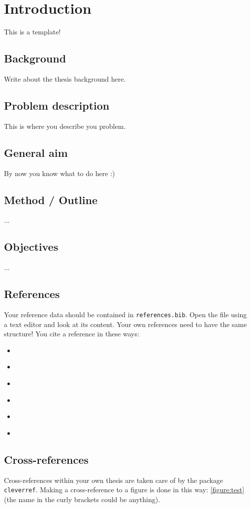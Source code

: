 \chapter{Introduction}
This is a template! 


\section{Background}
Write about the thesis background here.
\section{Problem description}
This is where you describe you problem.
\section{General aim}
By now you know what to do here :)
\section{Method / Outline }
...

\section{Objectives}
...

\section{References}
Your reference data should be contained in \texttt{references.bib}. Open the file using a text editor and look at its content. Your own references need to have the same structure! You cite a reference in these ways:
\begin{itemize}
	\item \textcite{Harryson2014}
	\item \textcite{Noren2006}
	\item \cite{Harryson2014}
	\item \citeauthor{Harryson2014}
	\item {}
	\item \cite{box1978,Harryson2014,matlab}
\end{itemize}

\section{Cross-references}
Cross-references within your own thesis are taken care of by the package \texttt{cleverref}. Making a cross-reference to a figure is done in this way: \cref{figure:test} (the name in the curly brackets could be anything).

